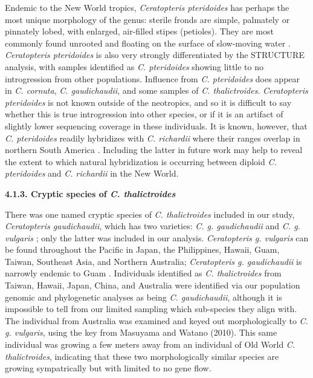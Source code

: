 \documentclass[12pt]{article}
\begin{document}
\begin{flushleft}
Endemic to the New World tropics, \textit{Ceratopteris pteridoides} has perhaps the most unique morphology of the genus: sterile fronds are simple, palmately or pinnately lobed, with enlarged, air-filled stipes (petioles). They are most commonly found unrooted and floating on the surface of slow-moving water \autocite{LloydTax1974}. \textit{Ceratopteris pteridoides} is also very strongly differentiated by the {\small{STRUCTURE}} analysis, with samples identified as \textit{C. pteridoides} showing little to no introgression from other populations. Influence from \textit{C. pteridoides} does appear in \textit{C. cornuta}, \textit{C. gaudichaudii}, and some samples of \textit{C. thalictroides}. \textit{Ceratopteris pteridoides} is not known outside of the neotropics, and so it is difficult to say whether this is true introgression into other species, or if it is an artifact of slightly lower sequencing coverage in these individuals. It is known, however, that \textit{C. pteridoides} readily hybridizes with \textit{C. richardii} where their ranges overlap in northern South America \autocite{hickok1974}. Including the latter in future work may help to reveal the extent to which natural hybridization is occurring between diploid \textit{C. pteridoides} and \textit{C. richardii} in the New World. 

\textbf{4.1.3. Cryptic species of \textit{C. thalictroides}}

There was one named cryptic species of \textit{C. thalictroides} included in our study, \textit{Ceratopteris gaudichaudii}, which has two varieties: \textit{C. g. gaudichaudii} and \textit{C. g. vulgaris} \autocite{Masuyama2010}; only the latter was included in our analysis. \textit{Ceratopteris g. vulgaris} can be found throughout the Pacific in Japan, the Philippines, Hawaii, Guam, Taiwan, Southeast Asia, and Northern Australia; \textit{Ceratopteris g. gaudichaudii} is narrowly endemic to Guam \autocite{Masuyama2010}. Individuals identified as \textit{C. thalictroides} from Taiwan, Hawaii, Japan, China, and Australia were identified via our population genomic and phylogenetic analyses as being \textit{C. gaudichaudii}, although it is impossible to tell from our limited sampling which sub-species they align with. The individual from Australia was examined and keyed out morphologically to \textit{C. g. vulgaris}, using the key from Masuyama and Watano (2010). This same individual was growing a few meters away from an individual of Old World \textit{C. thalictroides}, indicating that these two morphologically similar species are growing sympatrically but with limited to no gene flow. 


\end{flushleft}
\end{document}
